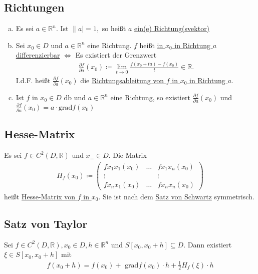 \documentclass{article}
\begin{document}
\subsection{Richtungen}
\begin{enumerate}[a)]
    \item Es sei $a \in \mathbb{R}^n$. Ist $\lVert a \rvert = 1,$ so heißt $a$ \underline{ein(e) Richtung(svektor)}
    \item Sei $x_0 \in D$ und $a \in \mathbb{R}^n$ eine Richtung. $f$ heißt \underline{in $x_0$ in Richtung $a$ differenzierbar} $\Leftrightarrow$ Es existiert der Grenzwert
    \begin{align*}
        \frac{\partial f}{\partial a}(x_0) \coloneqq \lim \limits_{t \to 0} \frac{f(x_0 + ta) -f(x_0)}{t} \in \mathbb{R}.
    \end{align*}
    I.d.F. heißt $\frac{\partial f}{\partial a}(x_0)$ die \underline{Richtungsableitung von $f$ in $x_0$ in Richtung $a$}.
    \item Ist $f$ in $x_0 \in D$ db und $a \in \mathbb{R}^n$ eine Richtung, so existiert $\frac{\partial f}{\partial a}(x_0)$ und 
    $\frac{\partial f}{\partial a}(x_0) = a \cdot \text{grad}f(x_0)$
\end{enumerate}

\subsection{Hesse-Matrix}
Es sei $f \in C^2(D,\mathbb{R})$ und $x_= \in D$. Die Matrix 
\begin{align*}
    H_f(x_0) \coloneqq \begin{pmatrix} f{x_1x_1}(x_0) & \ldots & f{x_1x_n}(x_0) \\ \vdots & & \vdots \\ f{x_nx_1}(x_0) & \ldots & f{x_nx_n}(x_0)\end{pmatrix}
\end{align*}
heißt \underline{Hesse-Matrix von $f$ in $x_0$}. Sie ist nach dem \hyperref[sec: Schwartz]{Satz von Schwartz} symmetrisch.

\subsection{Satz von Taylor}
Sei $f \in C^2(D,\mathbb{R}), x_0 \in D, h \in \mathbb{R}^n$ und $S[x_0,x_0+h] \subseteq D$. Dann existiert $\xi \in S[x_0,x_0+h]$ mit
\begin{align*}
    f(x_0+h) = f(x_0) + \text{ grad}f(x_0) \cdot h + \frac{1}{2} H_f(\xi) \cdot h
\end{align*}
\end{document}
